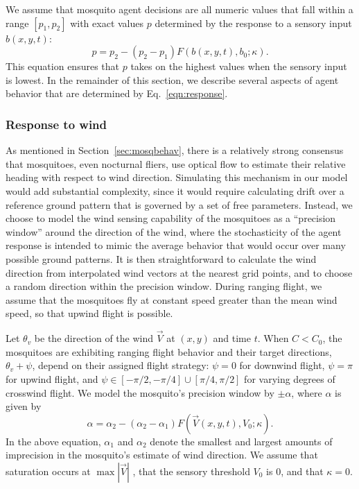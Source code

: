 \documentclass[12pt]{article}
\newif\ifcommentsw
\newcommand{\comment}[1]{\ifcommentsw  $\blacktriangleright$\ \textbf{#1}\ $\blacktriangleleft$ \fi}
\begin{document}
	
	We assume that mosquito agent decisions are all numeric values that fall within a range $[p_1, p_2]$ with exact values $p$ determined by the response to a sensory input $b(x,y,t)$:
	\begin{equation}
	p  = p_2 - (p_2 - p_1)F(b(x,y,t), b_0; \kappa). \label{eqn:response}
\end{equation}
	This equation ensures that $p$ takes on the highest values when the sensory input is lowest. In the remainder of this section, we describe several aspects of agent behavior that are determined by Eq.~\eqref{eqn:response}.
	

	\subsubsection{Response to wind}
	
	As mentioned in Section~\ref{sec:mosqbehav}, there is a relatively strong consensus that mosquitoes, even nocturnal fliers, use optical flow to estimate their relative heading with respect to wind direction. Simulating this mechanism in our model would add substantial complexity, since it would require calculating drift over a reference ground pattern that is governed by a set of free parameters. Instead, we choose to model the wind sensing capability of the mosquitoes as a ``precision window'' around the direction of the wind, where the stochasticity of the agent response is intended to mimic the average behavior that would occur over many possible ground patterns. It is then straightforward to calculate the wind direction from interpolated wind vectors at the nearest grid points, and to choose a random direction within the precision window. During ranging flight, we assume that the mosquitoes fly at constant speed greater than the mean wind speed, so that upwind flight is possible. 
	
	Let $\theta_v$ be the direction of the wind $\vec V$ at $(x,y)$ and time $t$. When $C < C_0$, the mosquitoes are exhibiting ranging flight behavior and their target directions, $\theta_v + \psi$, depend on their assigned flight strategy: $\psi=0$ for downwind flight, $\psi=\pi$ for upwind flight, and $\psi \in [-\pi/2, -\pi/4] \cup [\pi/4,\pi/2]$ for varying degrees of crosswind flight. We model the mosquito's precision window by $\pm\alpha$, where $\alpha$ is given by 
	\begin{equation}\label{eqn:alpha}
	\alpha = \alpha_2 - (\alpha_2 - \alpha_1)F(\vec V(x,y,t), V_0; \kappa).
\end{equation}
	In the above equation, $\alpha_1$ and $\alpha_2$ denote the smallest and largest amounts of imprecision in the mosquito's estimate of wind direction. We assume that saturation occurs at $\max |\vec V|$ \comment{Bree: May want some other value.}, that the sensory threshold $V_0$ is 0, and that $\kappa = 0$.
	
\end{document}

